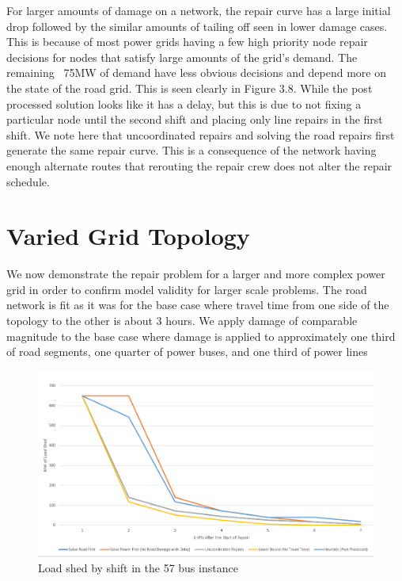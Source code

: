 For larger amounts of damage on a network, the repair curve has a large initial drop followed by the similar amounts of tailing off seen in lower damage cases. This is because of most power grids having a few high priority node repair decisions for nodes that satisfy large amounts of the grid's demand. The remaining ~75MW of demand have less obvious decisions and depend more on the state of the road grid. This is seen clearly in Figure 3.8. While the post processed solution looks like it has a delay, but this is due to not fixing a particular node until the second shift and placing only line repairs in the first shift. We note here that uncoordinated repairs and solving the road repairs first generate the same repair curve. This is a consequence of the network having enough alternate routes that rerouting the repair crew does not alter the repair schedule. 
\section{Varied Grid Topology}
We now demonstrate the repair problem for a larger and more complex power grid in order to confirm model validity for larger scale problems. The road network is fit as it was for the base case where travel time from one side of the topology to the other is about 3 hours. We apply damage of comparable magnitude to the base case where damage is applied to approximately one third of road segments, one quarter of power buses, and one third of power lines
\begin{figure}[htbp]
	\centering
	\includegraphics[width=.9\linewidth]{Rplot57.png}
	\caption{Load shed by shift in the 57 bus instance}
	\label{fig:sub2}
	
	
\end{figure}


